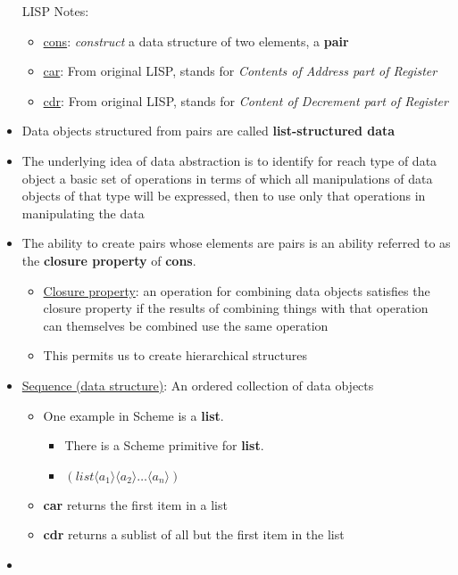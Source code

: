 \documentclass{article}
\begin{document}
\begin{itemize}
{    \parbox{\textwidth}{%
    LISP Notes:
    \begin{itemize}
    \item \underline{cons}: \textit{construct} a data structure of two elements, a \textbf{pair}
    \item \underline{car}: From original LISP, stands for \textit{Contents of Address part of Register}
    \item \underline{cdr}: From original LISP, stands for \textit{Content of Decrement part of Register}
    \end{itemize}
  }%
  }
\item Data objects structured from pairs are called \textbf{list-structured data}
\item The underlying idea of data abstraction is to identify for reach type of data object a basic set of operations in terms of which all manipulations of data objects of that type will be expressed, then to use only that operations in manipulating the data
\item The ability to create pairs whose elements are pairs is an ability referred to as the \textbf{closure property} of \textbf{cons}.
  \begin{itemize}
  \item \underline {Closure property}: an operation for combining data objects satisfies the closure property if the results of combining things with that operation can themselves be combined use the same operation
  \item This permits us to create hierarchical structures
  \end{itemize}
\item \underline{Sequence (data structure)}: An ordered collection of data objects
  \begin{itemize}
  \item One example in Scheme is a \textbf{list}.
    \begin{itemize}
    \item There is a Scheme primitive for \textbf{list}.
    \item $(list \langle a_1 \rangle \langle a_2 \rangle \dots \langle a_n \rangle)$
    \end{itemize}
  \item \textbf{car} returns the first item in a list
  \item \textbf{cdr} returns a sublist of all but the first item in the list
  \end{itemize}
\item
  \noindent\fbox{%
}
\end{itemize}
\end{document}
